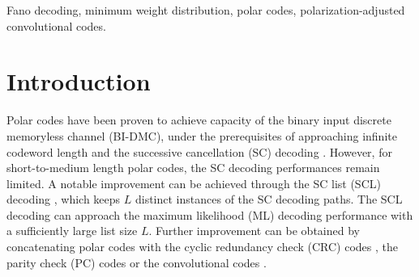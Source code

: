 \documentclass[12pt, draftclsnofoot, peerreview, onecolumn]{IEEEtran}
\theoremstyle{noparent}
\begin{document}
\begin{IEEEkeywords}
     Fano decoding, minimum weight distribution, polar codes, polarization-adjusted convolutional codes.
\end{IEEEkeywords}

\section{Introduction}

Polar codes have been proven to achieve capacity of
the binary input discrete memoryless channel (BI-DMC), 
under the prerequisites of approaching infinite codeword length and 
the successive cancellation (SC) decoding \cite{Arikan2009ChannelPolarizationMethod}.
However, for short-to-medium length polar codes, 
the SC decoding performances remain limited. 
A notable improvement can be achieved through the SC list (SCL) decoding \cite{Tal2015ListDecodingPolar}\cite{Niu2012CRCAidedDecoding}, 
which keeps $L$ distinct instances of the SC decoding paths. 
The SCL decoding can approach the maximum likelihood (ML) decoding performance with a sufficiently large list size $L$.
Further improvement can be obtained by concatenating polar codes with 
the cyclic redundancy check (CRC) codes \cite{Tal2015ListDecodingPolar}\cite{Niu2012CRCAidedDecoding}, 
the parity check (PC) codes \cite{Wang2016ParityCheckConcatenated}\cite{Zhang2018ParityCheckPolar} or 
the convolutional codes \cite{Fazeli2017ViterbiAidedSuccessive}\cite{Arikan2019sequentialdecodingchannel}.
\end{document}
